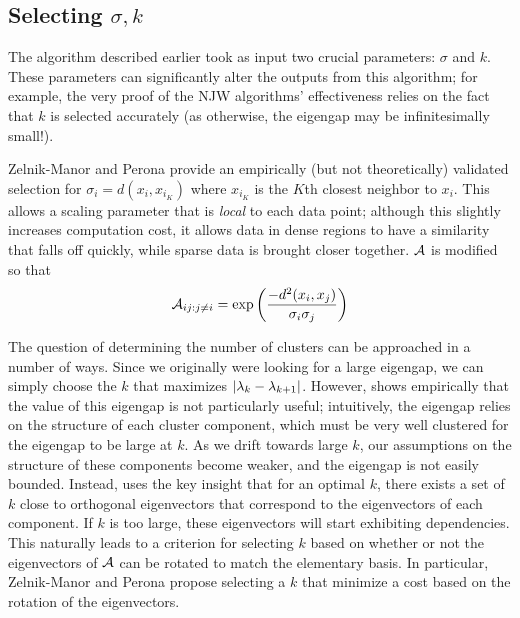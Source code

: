 \subsection{Selecting $\sigma, k$}
The algorithm described earlier took as input two crucial parameters: $\sigma$
and $k$. These parameters can significantly alter the outputs from this
algorithm; for example, the very proof of the NJW algorithms' effectiveness
relies on the fact that $k$ is selected accurately (as otherwise, the eigengap
may be infinitesimally small!).

Zelnik-Manor and Perona \cite{zelnik2004self} provide an empirically (but not
theoretically) validated selection for $\sigma_i = d(x_i, x_{i_K})$ where
$x_{i_K}$ is the $K$th closest neighbor to $x_i$. This allows a scaling
parameter that is \textit{local} to each data point; although this slightly
increases computation cost, it allows data in dense regions to have a
similarity that falls off quickly, while sparse data is brought closer
together. $\mathcal{A}$ is modified so that \[ \mathcal{A}_{ij : j \neq i} =
\exp{\left(\frac{-d^2(x_i,x_j)}{\sigma_i \sigma_j}\right)} \]

The question of determining the number of clusters can be approached in a number
of ways. Since we originally were looking for a large eigengap, we can simply
choose the $k$ that maximizes $\lvert\lambda_k - \lambda_{k+1}\rvert$. However,
\cite{zelnik2004self} shows empirically that the value of this eigengap is not
particularly useful; intuitively, the eigengap relies on the structure of each
cluster component, which must be very well clustered for the eigengap to be
large at $k$. As we drift towards large $k$, our assumptions on the structure
of these components become weaker, and the eigengap is not easily bounded.
Instead, \cite{zelnik2004self} uses the key insight that for an optimal $k$,
there exists a set of $k$ close to orthogonal eigenvectors that correspond to
the eigenvectors of each component. If $k$ is too large, these eigenvectors
will start exhibiting dependencies. This naturally leads to a criterion for
selecting $k$ based on whether or not the eigenvectors of $\mathcal{A}$ can be rotated
to match the elementary basis. In particular, Zelnik-Manor and Perona propose
selecting a $k$ that minimize a cost based on the rotation of the eigenvectors.
